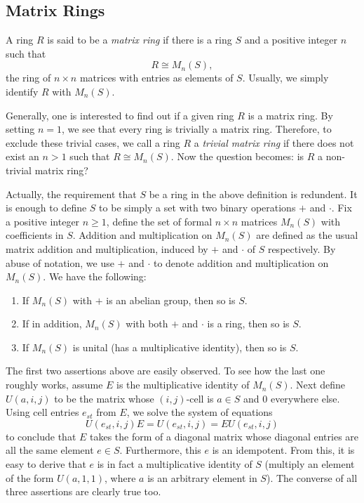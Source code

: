 \documentclass[12pt]{article}
\begin{document}
\subsection{Matrix Rings}
A ring $R$ is said to be a \emph{matrix ring} if there is a ring $S$ and a positive integer $n$ such that $$R\cong M_n(S),$$ the ring of $n\times n$ matrices with entries as elements of $S$.  Usually, we simply identify $R$ with $M_n(S)$.

Generally, one is interested to find out if a given ring $R$ is a matrix ring.  By setting $n=1$, we see that every ring is trivially a matrix ring.  Therefore, to exclude these trivial cases, we call a ring $R$ a \emph{trivial matrix ring} if there does not exist an $n>1$ such that $R\cong M_n(S)$.  Now the question becomes: is $R$ a non-trivial matrix ring?

Actually, the requirement that $S$ be a ring in the above definition is redundent.  It is enough to define $S$ to be simply a set with two binary operations $+$ and $\cdot$.  Fix a positive integer $n\ge 1$, define the set of formal $n\times n$ matrices $M_n(S)$ with coefficients in $S$.  Addition and multiplication on $M_n(S)$ are defined as the usual matrix addition and multiplication, induced by $+$ and $\cdot$ of $S$ respectively.  By abuse of notation, we use $+$ and $\cdot$ to denote addition and multiplication on $M_n(S)$.  We have the following:

\begin{enumerate}
\item If $M_n(S)$ with $+$ is an abelian group, then so is $S$.
\item If in addition, $M_n(S)$ with both $+$ and $\cdot$ is a ring, then so is $S$.
\item If $M_n(S)$ is unital (has a multiplicative identity), then so is $S$.
\end{enumerate}

The first two assertions above are easily observed.  To see how the last one roughly works, assume $E$ is the multiplicative identity of $M_n(S)$.  Next define $U(a,i,j)$ to be the matrix whose $(i,j)$-cell is $a\in S$ and $0$ everywhere else.  Using cell entries $e_{st}$ from $E$, we solve the system of equations $$U(e_{st},i,j)E=U(e_{st},i,j)=EU(e_{st},i,j)$$ to conclude that $E$ takes the form of a diagonal matrix whose diagonal entries are all the same element $e\in S$.  Furthermore, this $e$ is an idempotent.  From this, it is easy to derive that $e$ is in fact a multiplicative identity of $S$ (multiply an element of the form $U(a,1,1)$, where $a$ is an arbitrary element in $S$).  The converse of all three assertions are clearly true too.
\end{document}

